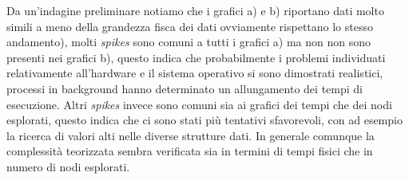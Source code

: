 \documentclass{article}
\begin{document}
Da un'indagine preliminare notiamo che i grafici a) e b) riportano dati molto simili a meno della grandezza fisca dei dati ovviamente rispettano lo stesso andamento), molti \textit{spikes} sono comuni a tutti i grafici a) ma non non sono presenti nei grafici b), questo indica che probabilmente i problemi individuati relativamente all'hardware e il sistema operativo si sono dimostrati realistici, processi in background hanno determinato un allungamento dei tempi di esecuzione. Altri \textit{spikes} invece sono comuni sia ai grafici dei tempi che dei nodi esplorati, questo indica che ci sono stati più tentativi sfavorevoli, con ad esempio la ricerca di valori alti nelle diverse strutture dati. In generale comunque la complessità teorizzata sembra verificata sia in termini di tempi fisici che in numero di nodi esplorati. 
\end{document}

